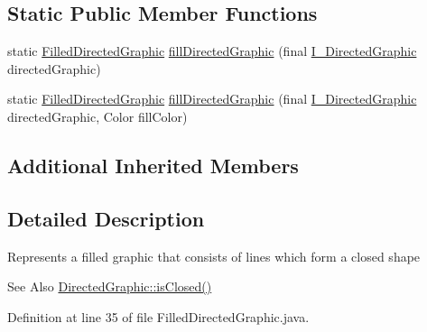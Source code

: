 \subsection*{Static Public Member Functions}
\begin{DoxyCompactItemize}
\item 
static \hyperlink{classorg_1_1tzi_1_1use_1_1gui_1_1views_1_1diagrams_1_1util_1_1_filled_directed_graphic}{Filled\-Directed\-Graphic} \hyperlink{classorg_1_1tzi_1_1use_1_1gui_1_1views_1_1diagrams_1_1util_1_1_filled_directed_graphic_afb7c808729e7398556f9f770debae6b2}{fill\-Directed\-Graphic} (final \hyperlink{interfaceorg_1_1tzi_1_1use_1_1gui_1_1views_1_1diagrams_1_1util_1_1_i___directed_graphic}{I\-\_\-\-Directed\-Graphic} directed\-Graphic)
\item 
static \hyperlink{classorg_1_1tzi_1_1use_1_1gui_1_1views_1_1diagrams_1_1util_1_1_filled_directed_graphic}{Filled\-Directed\-Graphic} \hyperlink{classorg_1_1tzi_1_1use_1_1gui_1_1views_1_1diagrams_1_1util_1_1_filled_directed_graphic_af39ece930d5562118a1773a0d3680fa5}{fill\-Directed\-Graphic} (final \hyperlink{interfaceorg_1_1tzi_1_1use_1_1gui_1_1views_1_1diagrams_1_1util_1_1_i___directed_graphic}{I\-\_\-\-Directed\-Graphic} directed\-Graphic, Color fill\-Color)
\end{DoxyCompactItemize}
\subsection*{Additional Inherited Members}


\subsection{Detailed Description}
Represents a filled graphic that consists of lines which form a closed shape

\begin{DoxySeeAlso}{See Also}
\hyperlink{classorg_1_1tzi_1_1use_1_1gui_1_1views_1_1diagrams_1_1util_1_1_directed_graphic_a6a822e239a37d2da78c2bf6937f28b16}{Directed\-Graphic\-::is\-Closed()} 
\end{DoxySeeAlso}


Definition at line 35 of file Filled\-Directed\-Graphic.\-java.



